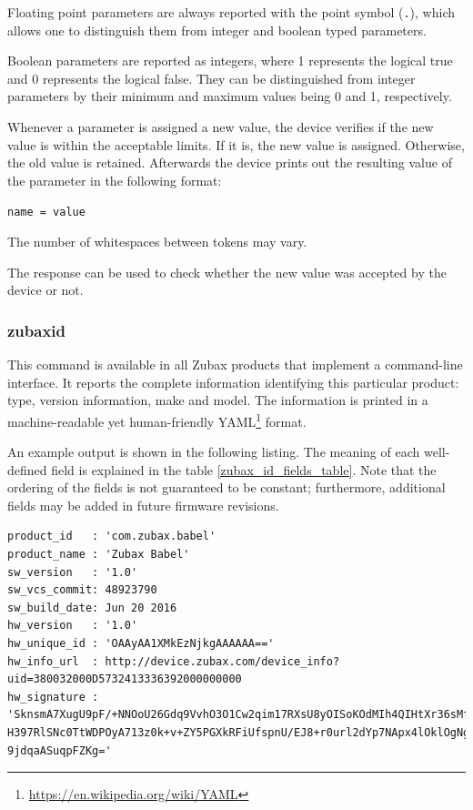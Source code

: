 \documentclass{zubaxdoc}
\begin{document}
Floating point parameters are always reported with the point symbol (\verb|.|),
which allows one to distinguish them from integer and boolean typed parameters.

Boolean parameters are reported as integers, where 1 represents the logical true and
0 represents the logical false.
They can be distinguished from integer parameters by their minimum and maximum values being 0 and 1,
respectively.

Whenever a parameter is assigned a new value, the device verifies if the new value is within the
acceptable limits.
If it is, the new value is assigned. Otherwise, the old value is retained.
Afterwards the device prints out the resulting value of the parameter in the following format:

\verb|name = value|

The number of whitespaces between tokens may vary.

The response can be used to check whether the new value was accepted by the device or not.

\subsubsection{zubax\textunderscore{}id}\label{sec:cli_command_zubax_id}

This command is available in all Zubax products that implement a command-line interface.
It reports the complete information identifying this particular product:
type, version information, make and model.
The information is printed in a machine-readable yet human-friendly
YAML\footnote{\url{https://en.wikipedia.org/wiki/YAML}} format.

An example output is shown in the following listing.
The meaning of each well-defined field is explained in the table \ref{zubax_id_fields_table}.
Note that the ordering of the fields is not guaranteed to be constant;
furthermore, additional fields may be added in future firmware revisions.

\begin{minipage}{0.9\textwidth} %
\begin{verbatim}
product_id   : 'com.zubax.babel'
product_name : 'Zubax Babel'
sw_version   : '1.0'
sw_vcs_commit: 48923790
sw_build_date: Jun 20 2016
hw_version   : '1.0'
hw_unique_id : 'OAAyAA1XMkEzNjkgAAAAAA=='
hw_info_url  : http://device.zubax.com/device_info?uid=380032000D5732413336392000000000
hw_signature : 'SknsmA7XugU9pF/+NNOoU26Gdq9VvhO3O1Cw2qim17RXsU8yOISoKOdMIh4QIHtXr36sMfx
H397RlSNc0TtWDPOyA713z0k+v+ZY5PGXkRFiUfspnU/EJ8+r0url2dYp7NApx4lOklOgNgHrGCA6lPxA8UqoW
9jdqaASuqpFZKg='
\end{verbatim}
\end{minipage}
\end{document}

